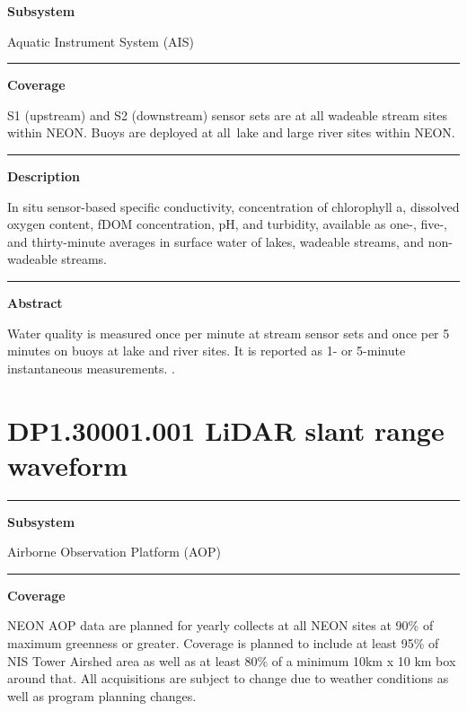 \documentclass[]{article}
\begin{document}
\textbf{Subsystem}

Aquatic Instrument System (AIS)

\begin{center}\rule{0.5\linewidth}{\linethickness}\end{center}

\textbf{Coverage}

S1 (upstream) and S2 (downstream) sensor sets are at all wadeable stream
sites within NEON. Buoys are deployed at all~lake and large river sites
within NEON.

\begin{center}\rule{0.5\linewidth}{\linethickness}\end{center}

\textbf{Description}

In situ sensor-based specific conductivity, concentration of chlorophyll
a, dissolved oxygen content, fDOM concentration, pH, and turbidity,
available as one-, five-, and thirty-minute averages in surface water of
lakes, wadeable streams, and non-wadeable streams.

\begin{center}\rule{0.5\linewidth}{\linethickness}\end{center}

\textbf{Abstract}

Water quality is measured once per minute at stream sensor sets and once
per 5 minutes on buoys at lake and river sites. It is reported as 1- or
5-minute instantaneous measurements. \newpage
.

\section{DP1.30001.001 LiDAR slant range
waveform}\label{dp1.30001.001-lidar-slant-range-waveform}

\begin{center}\rule{0.5\linewidth}{\linethickness}\end{center}

\textbf{Subsystem}

Airborne Observation Platform (AOP)

\begin{center}\rule{0.5\linewidth}{\linethickness}\end{center}

\textbf{Coverage}

NEON AOP data are planned for yearly collects at all NEON sites at 90\%
of maximum greenness or greater. Coverage is planned to include at least
95\% of NIS Tower Airshed area as well as at least 80\% of a minimum
10km x 10 km box around that. All acquisitions are subject to change due
to weather conditions as well as program planning changes.
\end{document}
